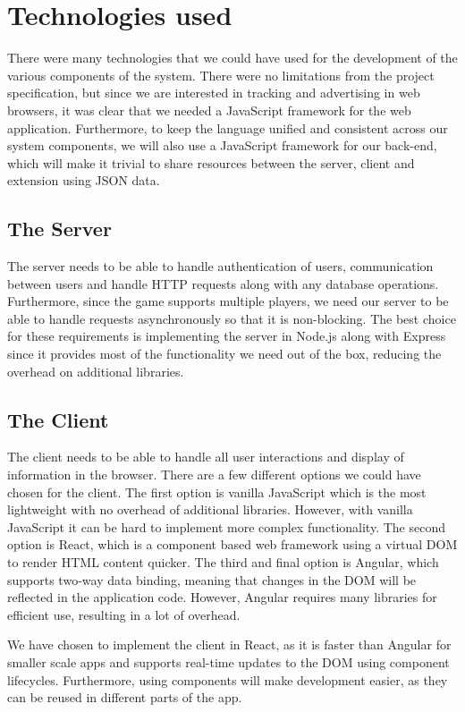 \documentclass{l4proj}
\begin{document}
\section{Technologies used}
There were many technologies that we could have used for the development of the various components of the system. There were no limitations from the project specification, but since we are interested in tracking and 
advertising in web browsers, it was clear that we needed a JavaScript framework for the web application. Furthermore, to keep the language unified and consistent across our system components, we will also use a JavaScript framework for our
back-end, which will make it trivial to share resources between the server, client and extension using JSON data. 

\subsection{The Server}
The server needs to be able to handle authentication of users, communication between users and handle HTTP requests along with any database operations. Furthermore, since the game supports multiple players, we need
our server to be able to handle requests asynchronously so that it is non-blocking. The best choice for these requirements is implementing the server in Node.js along with Express since it provides most of the functionality we need out of the box, reducing the overhead
on additional libraries.  

\subsection{The Client}
The client needs to be able to handle all user interactions and display of information in the browser. There are a few different options we could have chosen for the client. The first option is vanilla JavaScript which is the most lightweight
with no overhead of additional libraries. However, with vanilla JavaScript it can be hard to implement more complex functionality. The second option is React, which is a component based web framework using a virtual DOM to render HTML 
content quicker. The third and final option is Angular, which supports two-way data binding, meaning that changes in the DOM will be reflected in the application code. However, Angular requires many libraries for efficient use, resulting in a lot
of overhead.

We have chosen to implement the client in React, as it is faster than Angular for smaller scale apps and supports real-time updates to the DOM using component lifecycles. Furthermore, using components will make development easier, as they
can be reused in different parts of the app.
\end{document}
